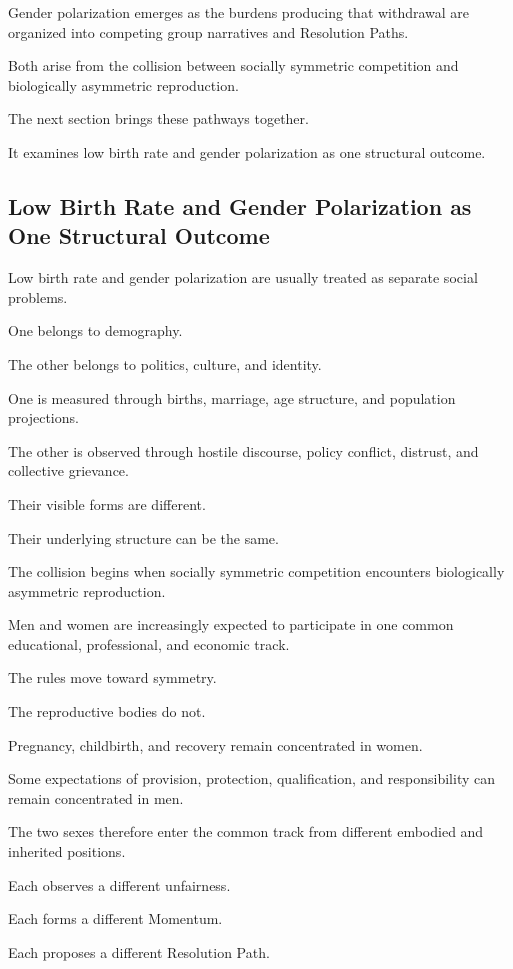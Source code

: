 Gender polarization emerges as the burdens producing that withdrawal are organized into competing group narratives and Resolution Paths.

Both arise from the collision between socially symmetric competition and biologically asymmetric reproduction.

The next section brings these pathways together.

It examines low birth rate and gender polarization as one structural outcome.

\subsection*{\textbf{Low Birth Rate and Gender Polarization as One Structural Outcome}} 


Low birth rate and gender polarization are usually treated as separate social problems.

One belongs to demography.

The other belongs to politics, culture, and identity.

One is measured through births, marriage, age structure, and population projections.

The other is observed through hostile discourse, policy conflict, distrust, and collective grievance.

Their visible forms are different.

Their underlying structure can be the same.

The collision begins when socially symmetric competition encounters biologically asymmetric reproduction.

Men and women are increasingly expected to participate in one common educational, professional, and economic track.

The rules move toward symmetry.

The reproductive bodies do not.

Pregnancy, childbirth, and recovery remain concentrated in women.

Some expectations of provision, protection, qualification, and responsibility can remain concentrated in men.

The two sexes therefore enter the common track from different embodied and inherited positions.

Each observes a different unfairness.

Each forms a different Momentum.

Each proposes a different Resolution Path.

